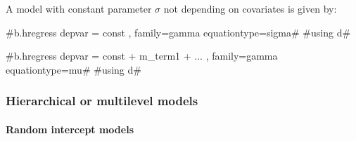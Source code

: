 A model with constant parameter $\sigma$ not depending on covariates is given by:

#b.hregress depvar = const  , family=gamma equationtype=sigma#
#using d#

#b.hregress depvar = const + m_term1 + ... , family=gamma equationtype=mu#
#using d#



%
%
%
%
%
%
%
%
%
%
%
%
%
%
%
%
%
%
%


\subsubsection{Hierarchical or multilevel models}
 \label{mcmcregmultilevelsyntax}

\paragraph{Random intercept models}

